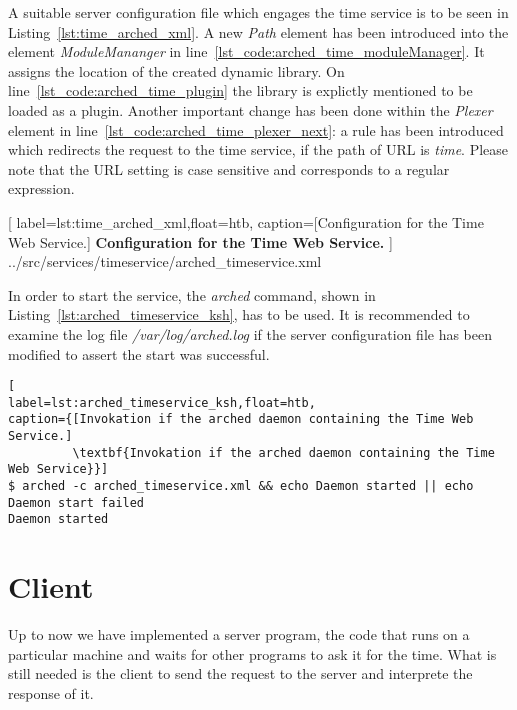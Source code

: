 A suitable server configuration file which engages the time service is to be seen in Listing~\ref{lst:time_arched_xml}.
A new \textit{Path} element has been introduced into the element \textit{ModuleMananger} in line~\ref{lst_code:arched_time_moduleManager}.
It assigns the location of the created dynamic library.
On line~\ref{lst_code:arched_time_plugin} the library is explictly mentioned to be loaded as a plugin.
Another important change has been done within the \textit{Plexer} element in line~\ref{lst_code:arched_time_plexer_next}:
a rule has been introduced which redirects the request to the time service, if the path of URL is \textit{time}. 
Please note that the URL setting is case sensitive and corresponds to a regular expression.\\


	[
	label=lst:time_arched_xml,float=htb,
	caption={[Configuration for the Time Web Service.]
	\textbf{Configuration for the Time Web Service.}}
	]
{../src/services/timeservice/arched_timeservice.xml}

In order to start the service, the \textit{arched} command, shown in Listing~\ref{lst:arched_timeservice_ksh}, has to be used.
It is recommended to examine the log file \textit{/var/log/arched.log} if the server configuration file has been modified to  assert the start was successful.

\begin{lstlisting}[
label=lst:arched_timeservice_ksh,float=htb,
caption={[Invokation if the arched daemon containing the Time Web Service.]
         \textbf{Invokation if the arched daemon containing the Time Web Service}}]
$ arched -c arched_timeservice.xml && echo Daemon started || echo Daemon start failed
Daemon started
\end{lstlisting}



\section{Client}\label{sec:timeservice_client}

Up to now we have implemented a server program, the code that runs on a particular machine and waits for other programs to ask it for the time. What is still needed is the client to send the request to the server and interprete the response of it.

